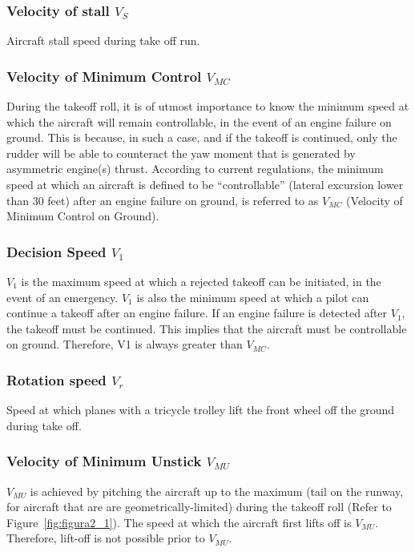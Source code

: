 \subsubsection{Velocity of stall $V_{S}$}
Aircraft stall speed during take off run.

\subsubsection{Velocity of Minimum Control $V_{MC}$}
During the takeoff roll, it is of utmost importance to know the minimum speed at which
the aircraft will remain controllable, in the event of an engine failure on ground. This is
because, in such a case, and if the takeoff is continued, only the rudder will be able to
counteract the yaw moment that is generated by asymmetric engine(s) thrust.
According to current regulations, the minimum speed at which an aircraft is defined to be “controllable”
(lateral excursion lower than 30 feet) after an engine failure on ground, is referred to
as $V_{MC}$ (Velocity of Minimum Control on Ground). 

\subsubsection{Decision Speed $V_1$}
$V_1$ is the maximum speed at which a rejected takeoff can be initiated, in the event of an
emergency. $V_1$ is also the minimum speed at which a pilot can continue a takeoff after an engine
failure.
If an engine failure is detected after $V_1$, the takeoff must be continued. This implies that
the aircraft must be controllable on ground. Therefore, V1 is always greater than $V_{MC}$.

\subsubsection{Rotation speed $V_r$}
Speed at which planes with a tricycle trolley lift the front wheel off the ground during take off.
 
\subsubsection{Velocity of Minimum Unstick $V_{MU}$}
 $V_{MU}$ is achieved by pitching the aircraft up to the maximum (tail on the runway, for
aircraft that are are geometrically-limited) during the takeoff roll (Refer to Figure~\ref{fig:figura2_1}). The speed at which the aircraft first lifts off is  $V_{MU}$. Therefore, lift-off is not
possible prior to  $V_{MU}$. 

